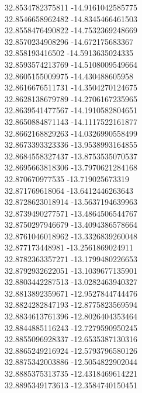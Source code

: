 {32.8534782375811	-14.9161042585775\\
32.8546658962482	-14.8345466461503\\
32.8558476490822	-14.7532369248669\\
32.8570234908296	-14.672175683367\\
32.858193416502	-14.5913635024335\\
32.8593574213769	-14.5108009549664\\
32.8605155009975	-14.430488605958\\
32.8616676511731	-14.3504270124675\\
32.8628138679789	-14.2706167235965\\
32.8639541477567	-14.1910582804651\\
32.8650884871143	-14.1117522161877\\
32.8662168829263	-14.0326990558499\\
32.8673393323336	-13.9538993164855\\
32.8684558327437	-13.8753535070537\\
32.8695663818306	-13.7970621284168\\
32.870670977535	-13.719025673319\\
32.871769618064	-13.6412446263643\\
32.8728623018914	-13.5637194639963\\
32.8739490277571	-13.4864506544767\\
32.8750297946679	-13.4094386578664\\
32.8761046018962	-13.3326839260048\\
32.877173448981	-13.2561869024911\\
32.8782363357271	-13.1799480226653\\
32.8792932622051	-13.1039677135901\\
32.8803442287513	-13.0282463940327\\
32.8813892359671	-12.9527844744476\\
32.8824282847193	-12.8775823569594\\
32.8834613761396	-12.8026404353464\\
32.8844885116243	-12.7279590950245\\
32.8855096928337	-12.6535387130316\\
32.8865249216924	-12.5793796580126\\
32.8875342003886	-12.5054822902044\\
32.8885375313735	-12.4318469614221\\
32.8895349173613	-12.3584740150451\\
}
